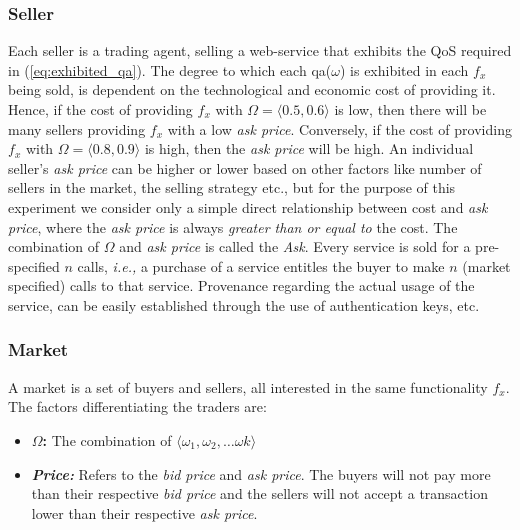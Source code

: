 \documentclass[10pt,journal,compsoc]{IEEEtran}
\begin{document}
\subsubsection{Seller}
Each seller is a trading agent, selling a web-service that exhibits the QoS required in (\ref{eq:exhibited_qa}). The degree to which each qa($\omega$) is exhibited in each $f_x$ being sold, is dependent on the technological and economic cost of providing it. Hence, if the cost of providing $f_x$ with $\Omega = \langle 0.5, 0.6 \rangle$ is low, then there will be many sellers providing $f_x$ with a low \textsl{ask price}. Conversely, if the cost of providing $f_x$ with $\Omega = \langle 0.8, 0.9 \rangle$ is high, then the \textsl{ask price} will be high. An individual seller's \textsl{ask price} can be higher or lower based on other factors like number of sellers in the market, the selling strategy etc., but for the purpose of this experiment we consider only a simple direct relationship between cost and \textsl{ask price}, where the \textsl{ask price} is always \textit{greater than or equal to} the cost. The combination of $\Omega$ and \textsl{ask price} is called the \textsl{Ask}. Every service is sold for a pre-specified $n$ calls, \textit{i.e.,} a purchase of a service entitles the buyer to make $n$ (market specified) calls to that service. Provenance regarding the actual usage of the service, can be easily established through the use of authentication keys, etc. 

\subsubsection{Market} 
A market is a set of buyers and sellers, all interested in the same functionality $f_x$. The factors differentiating the traders are:
	\begin{itemize}
	 \item \textbf{$\Omega$:} The combination of $\langle \omega_{1}, \omega_{2}, \ldots \omega{k}\rangle$
	 \item \textbf{\textsl{Price:}} Refers to the \textsl{bid price} and \textsl{ask price}. The buyers will not pay more than their respective \textsl{bid price} and the sellers will not accept a transaction lower than their respective \textsl{ask price}. 
	\end{itemize}
\end{document}
